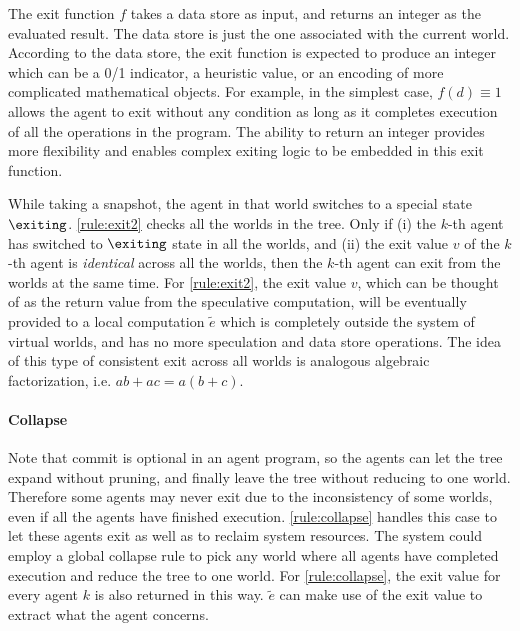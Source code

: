The exit function $f$ takes a data store as input, and returns an integer as the evaluated result. 
The data store is just the one associated with the current world. 
According to the data store, the exit function is expected to produce an integer 
which can be a 0/1 indicator, a heuristic value, or an encoding of more complicated mathematical objects. 
For example, in the simplest case, $f(d)\equiv 1$ allows the agent to exit without any condition 
as long as it completes execution of all the operations in the program. 
The ability to return an integer provides more flexibility and enables 
complex exiting logic to be embedded in this exit function.

While taking a snapshot, 
the agent in that world switches to a special state $\exiting$.
\ref{rule:exit2} checks all the worlds in the tree. Only if (i) the $k$-th agent has 
switched to $\exiting$ state in all the worlds, and (ii) the exit value $v$ of the $k$-th agent 
is {\em identical} across all the worlds, 
then the $k$-th agent can exit from the worlds at the same time. 
For \ref{rule:exit2}, the exit value $v$, which can be thought of as the return value from
the speculative computation, will be eventually provided to 
a local computation $\tilde e$
which is completely outside the system of virtual worlds, 
and has no more speculation and data store operations. 
The idea of this type of consistent exit across all worlds is analogous
algebraic factorization, i.e.
$ab + ac = a(b+c)$.

\paragraph*{Collapse}
Note that commit is optional in an agent program, so the agents can 
let the tree expand without pruning, and finally leave the tree 
without reducing to one world. 
Therefore some agents may never exit due to the inconsistency of some worlds, 
even if all the agents have finished execution.
\ref{rule:collapse} handles this case 
to let these agents exit as well as to reclaim system resources. 
The system could employ a global collapse rule to pick any world where 
all agents have completed execution and reduce the tree to one world.
For \ref{rule:collapse}, the exit value for every agent $k$ is also returned in this way.
$\tilde e$ can make use of the exit value to extract what the agent concerns. 

